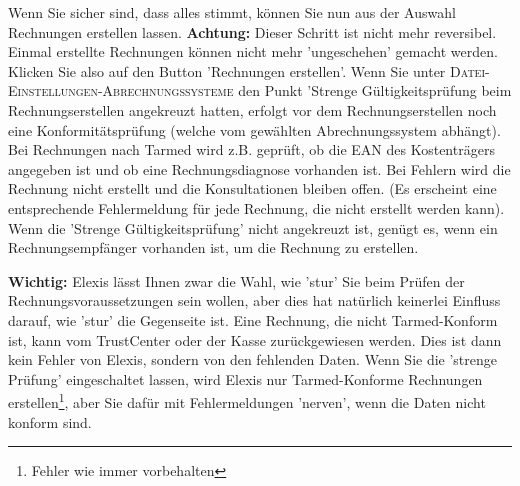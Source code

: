 \documentclass[a4paper]{scrartcl}
\begin{document}
\medskip

Wenn Sie sicher sind, dass alles stimmt, können Sie nun aus der Auswahl Rechnungen erstellen lassen. \textbf{Achtung:} Dieser Schritt ist nicht mehr reversibel. Einmal erstellte Rechnungen können nicht mehr 'ungeschehen' gemacht werden. Klicken Sie also auf den Button 'Rechnungen erstellen'.
Wenn Sie unter \textsc{Datei-Einstellungen-Abrechnungssysteme} den Punkt 'Strenge Gültigkeitsprüfung beim Rechnungserstellen  angekreuzt hatten, erfolgt vor dem Rechnungserstellen noch eine Konformitätsprüfung (welche  vom gewählten Abrechnungssystem abhängt). Bei Rechnungen nach Tarmed wird z.B. geprüft, ob die EAN des Kostenträgers angegeben ist und ob eine Rechnungsdiagnose vorhanden ist. Bei Fehlern wird die Rechnung nicht erstellt und die Konsultationen bleiben offen. (Es erscheint eine entsprechende Fehlermeldung für jede Rechnung, die nicht erstellt werden kann).
Wenn die 'Strenge Gültigkeitsprüfung' nicht angekreuzt ist, genügt es, wenn ein Rechnungsempfänger vorhanden ist, um die Rechnung zu erstellen.

\medskip

\textbf{Wichtig:} Elexis lässt Ihnen zwar die Wahl, wie 'stur' Sie beim Prüfen der Rechnungsvoraussetzungen sein wollen, aber dies hat natürlich keinerlei Einfluss darauf, wie 'stur' die Gegenseite ist. Eine Rechnung, die nicht Tarmed-Konform ist, kann vom TrustCenter oder der Kasse zurückgewiesen werden. Dies ist dann kein Fehler von Elexis, sondern von den fehlenden Daten. Wenn Sie die 'strenge Prüfung' eingeschaltet lassen, wird Elexis nur Tarmed-Konforme Rechnungen erstellen\footnote{Fehler wie immer vorbehalten}, aber Sie dafür mit Fehlermeldungen 'nerven', wenn die Daten nicht konform sind.
\end{document}
